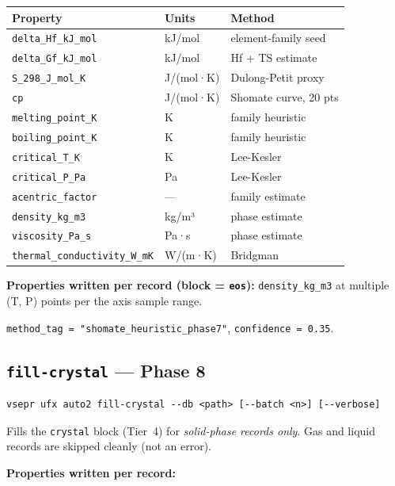 \documentclass[11pt,letterpaper]{article}
\begin{document}
\begin{center}
\begin{tabular}{lll}
\toprule
Property & Units & Method \\
\midrule
\texttt{delta\_Hf\_kJ\_mol}     & kJ/mol    & element-family seed \\
\texttt{delta\_Gf\_kJ\_mol}     & kJ/mol    & Hf + TS estimate \\
\texttt{S\_298\_J\_mol\_K}      & J/(mol·K) & Dulong-Petit proxy \\
\texttt{cp}                     & J/(mol·K) & Shomate curve, 20 pts \\
\texttt{melting\_point\_K}      & K         & family heuristic \\
\texttt{boiling\_point\_K}      & K         & family heuristic \\
\texttt{critical\_T\_K}         & K         & Lee-Kesler \\
\texttt{critical\_P\_Pa}        & Pa        & Lee-Kesler \\
\texttt{acentric\_factor}       & ---       & family estimate \\
\texttt{density\_kg\_m3}        & kg/m³     & phase estimate \\
\texttt{viscosity\_Pa\_s}       & Pa·s      & phase estimate \\
\texttt{thermal\_conductivity\_W\_mK} & W/(m·K) & Bridgman \\
\bottomrule
\end{tabular}
\end{center}

\textbf{Properties written per record (block = \texttt{eos}):}
\texttt{density\_kg\_m3} at multiple (T, P) points per the axis sample range.

\texttt{method\_tag = "shomate\_heuristic\_phase7"}, \texttt{confidence = 0.35}.

\subsection{\texttt{fill-crystal} --- Phase 8}

\begin{lstlisting}
vsepr ufx auto2 fill-crystal --db <path> [--batch <n>] [--verbose]
\end{lstlisting}

Fills the \texttt{crystal} block (Tier~4) for \emph{solid-phase records
only}.  Gas and liquid records are skipped cleanly (not an error).

\textbf{Properties written per record:}
\end{document}
